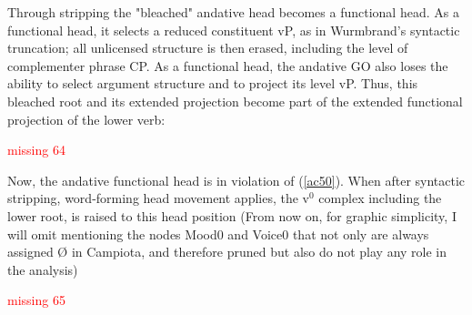 \documentclass[output=paper]{langscibook}
\begin{document}
Through stripping the "bleached" andative head becomes a functional head. As a functional head, it selects a reduced constituent vP, as in Wurmbrand's syntactic truncation; all unlicensed structure is then erased, including the level of complementer  phrase CP. As a functional head, the andative GO also loses the ability to select argument structure and to project its level vP. Thus, this bleached root and its extended projection become part of the extended functional projection of the lower verb: 

\ea
\textcolor{red}{missing 64}
\z

Now, the andative functional head is in violation of (\ref{ac50}).  When after syntactic stripping, word-forming head movement applies, the v$^0$ complex including the lower root, is raised to this head position (From now on, for graphic simplicity, I will omit mentioning the nodes Mood0 and Voice0 that not only are always assigned Ø in Campiota, and therefore pruned but also do not play any role in the analysis)

\ea
\textcolor{red}{missing 65}
\z
\end{document}
